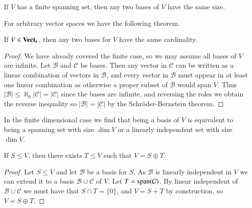 \begin{corollary}
    If $V$ has a finite spanning set, then any two bases of $V$ have the same size.
\end{corollary}

For arbitrary vector spaces we have the following theorem.

\begin{theorem}
    If $V \in \normalfont\textbf{Vect}_{k}$, then any two bases for $V$ have the same cardinality.
\end{theorem}
\begin{proof}
    We have already covered the finite case, so we may assume all bases of $V$ are infinite. Let $\mathcal{B}$ and $\mathcal{C}$ be bases. Then any vector in $\mathcal{C}$ can be written as a linear combination of vectors in $\mathcal{B}$, and every vector in $\mathcal{B}$ must appear in at least one linear combination as otherwise a proper subset of $\mathcal{B}$ would span $V$. Thus $|\mathcal{B}| \leq \aleph_0|\mathcal{C}| = |\mathcal{C}|$ since the bases are infinite, and reversing the roles we obtain the reverse inequality so $|\mathcal{B}| = |\mathcal{C}|$ by the Schr\"{o}der-Bernstein theorem.
\end{proof}

In the finite dimensional case we find that being a basis of $V$ is equivalent to being a spanning set with size $\dim V$ or a linearly independent set with size $\dim V$.

\begin{theorem}
    If $S \leq V$, then there exists $T \leq V$ such that $V = S\oplus T$.
\end{theorem}
\begin{proof}
    Let $S \leq V$ and let $\mathcal{B}$ be a basis for $S$. As $\mathcal{B}$ is linearly independent in $V$ we can extend it to a basis $\mathcal{B}\cup \mathcal{C}$ of $V$. Let $T = \operatorname{span}(\mathcal{C})$. By linear independent of $\mathcal{B}\cup\mathcal{C}$ we must have that $S\cap T = \{0\}$, and $V = S+T$ by construction, so $V = S\oplus T$.
\end{proof}

